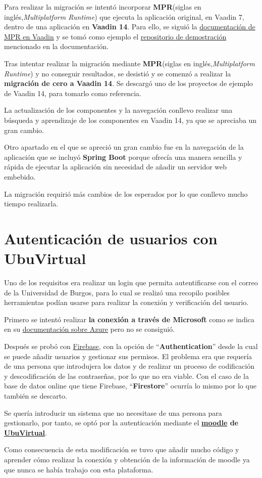 Para realizar la migración se intentó incorporar \textbf{MPR}(siglas en inglés,\emph{Multiplatform Runtime}) que ejecuta la aplicación original, en Vaadin 7, dentro de una aplicación en \textbf{Vaadin 14}. Para ello, se siguió la \href{https://vaadin.com/docs/v14/tools/mpr/introduction/step-1-maven-v7}{documentación de MPR en Vaadin} y se tomó como ejemplo el \href{https://github.com/OlliTietavainenVaadin/mpr-demo/tree/v7}{repositorio de demostración} mencionado en la documentación.

Tras intentar realizar la migración mediante \textbf{MPR}(siglas en inglés,\emph{Multiplatform Runtime}) y no conseguir resultados, se desistió y se comenzó a realizar la \textbf{migración de cero a Vaadin 14}. Se descargó uno de los proyectos de ejemplo de Vaadin 14, para tomarlo como referencia. 

La actualización de los componentes y la navegación conllevo realizar una búsqueda y aprendizaje de los componentes en Vaadin 14, ya que se apreciaba un gran cambio.

Otro apartado en el que se apreció un gran cambio fue en la navegación de la aplicación que se incluyó \textbf{Spring Boot} porque ofrecía una manera sencilla y rápida de ejecutar la aplicación sin necesidad de añadir un servidor web embebido.

La migración requirió más cambios de los esperados por lo que conllevo mucho tiempo realizarla.

\section{Autenticación de usuarios con UbuVirtual}

Uno de los requisitos era realizar un login que permita autentificarse con el correo de la Universidad de Burgos, para lo cual se realizó una recopilo posibles herramientas podían usarse para realizar la conexión y verificación del usuario.

Primero se intentó realizar \textbf{la conexión a través de Microsoft} como se indica en su \href{https://docs.microsoft.com/en-us/azure/active-directory/develop/quickstart-v2-java-webapp}{documentación sobre Azure} pero no se consiguió.

Después se probó con \href{https://firebase.google.com/}{Firebase}, con la opción de ``\textbf{Authentication}'' desde la cual se puede añadir usuarios y gestionar sus permisos. El problema era que requería de una persona que introdujera los datos y de realizar un proceso de codificación y descodificación de las contraseñas, por lo que no era viable. Con el caso de la base de datos online que tiene Firebase, ``\textbf{Firestore}'' ocurría lo mismo por lo que también se descarto.  

Se quería introducir un sistema que no necesitase de una persona para gestionarlo, por tanto, se optó por la autenticación mediante el \textbf{\href{https://moodle.org/}{moodle} de \href{https://ubuvirtual.ubu.es/}{UbuVirtual}}. 

Como consecuencia de esta modificación se tuvo que añadir mucho código y aprender cómo realizar la conexión y obtención de la información de moodle ya que nunca se había trabajo con esta plataforma.
